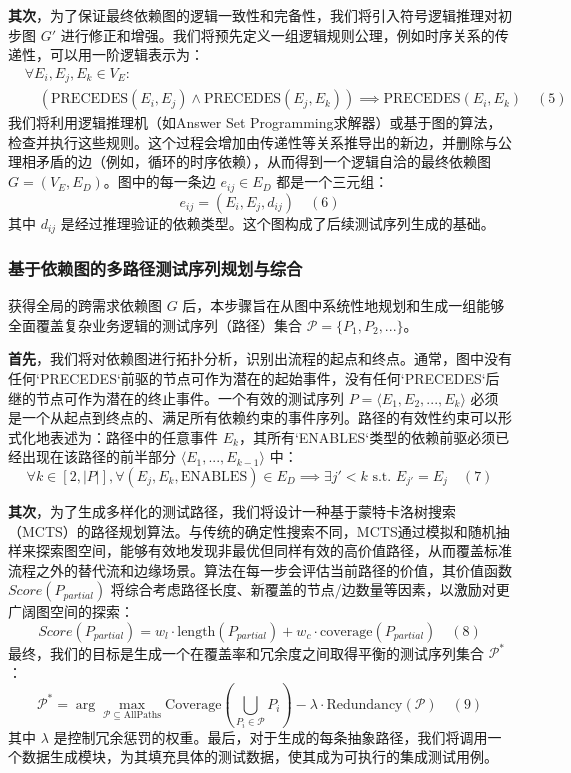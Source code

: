 \documentclass[12pt]{article}
\begin{document}
\textbf{其次}，为了保证最终依赖图的逻辑一致性和完备性，我们将引入符号逻辑推理对初步图 $G'$ 进行修正和增强。我们将预先定义一组逻辑规则公理，例如时序关系的传递性，可以用一阶逻辑表示为：
$$
\begin{aligned}
&\forall E_i, E_j, E_k \in V_E: \\
&\quad (\text{PRECEDES}(E_i, E_j) \land \text{PRECEDES}(E_j, E_k)) \implies \text{PRECEDES}(E_i, E_k) \quad (5)
\end{aligned}
$$
我们将利用逻辑推理机（如Answer Set Programming求解器）或基于图的算法，检查并执行这些规则。这个过程会增加由传递性等关系推导出的新边，并删除与公理相矛盾的边（例如，循环的时序依赖），从而得到一个逻辑自洽的最终依赖图 $G = (V_E, E_D)$。图中的每一条边 $e_{ij} \in E_D$ 都是一个三元组：
$$
e_{ij} = (E_i, E_j, d_{ij}) \quad (6)
$$
其中 $d_{ij}$ 是经过推理验证的依赖类型。这个图构成了后续测试序列生成的基础。

\subsubsection{基于依赖图的多路径测试序列规划与综合}

获得全局的跨需求依赖图 $G$ 后，本步骤旨在从图中系统性地规划和生成一组能够全面覆盖复杂业务逻辑的测试序列（路径）集合 $\mathcal{P} = \{P_1, P_2, ...\}$。

\textbf{首先}，我们将对依赖图进行拓扑分析，识别出流程的起点和终点。通常，图中没有任何`PRECEDES`前驱的节点可作为潜在的起始事件，没有任何`PRECEDES`后继的节点可作为潜在的终止事件。一个有效的测试序列 $P = \langle E_1, E_2, ..., E_k \rangle$ 必须是一个从起点到终点的、满足所有依赖约束的事件序列。路径的有效性约束可以形式化地表述为：路径中的任意事件 $E_k$，其所有`ENABLES`类型的依赖前驱必须已经出现在该路径的前半部分 $\langle E_1, ..., E_{k-1} \rangle$ 中：
$$
\forall k \in [2, |P|], \forall (E_j, E_k, \text{ENABLES}) \in E_D \implies \exists j' < k \text{ s.t. } E_{j'} = E_j \quad (7)
$$

\textbf{其次}，为了生成多样化的测试路径，我们将设计一种基于蒙特卡洛树搜索（MCTS）的路径规划算法。与传统的确定性搜索不同，MCTS通过模拟和随机抽样来探索图空间，能够有效地发现非最优但同样有效的高价值路径，从而覆盖标准流程之外的替代流和边缘场景。算法在每一步会评估当前路径的价值，其价值函数 $Score(P_{partial})$ 将综合考虑路径长度、新覆盖的节点/边数量等因素，以激励对更广阔图空间的探索：
$$
Score(P_{partial}) = w_l \cdot \text{length}(P_{partial}) + w_c \cdot \text{coverage}(P_{partial}) \quad (8)
$$
最终，我们的目标是生成一个在覆盖率和冗余度之间取得平衡的测试序列集合 $\mathcal{P}^*$：
$$
\mathcal{P}^* = \arg\max_{\mathcal{P} \subseteq \text{AllPaths}} \text{Coverage}(\bigcup_{P_i \in \mathcal{P}} P_i) - \lambda \cdot \text{Redundancy}(\mathcal{P}) \quad (9)
$$
其中 $\lambda$ 是控制冗余惩罚的权重。最后，对于生成的每条抽象路径，我们将调用一个数据生成模块，为其填充具体的测试数据，使其成为可执行的集成测试用例。
\end{document}
